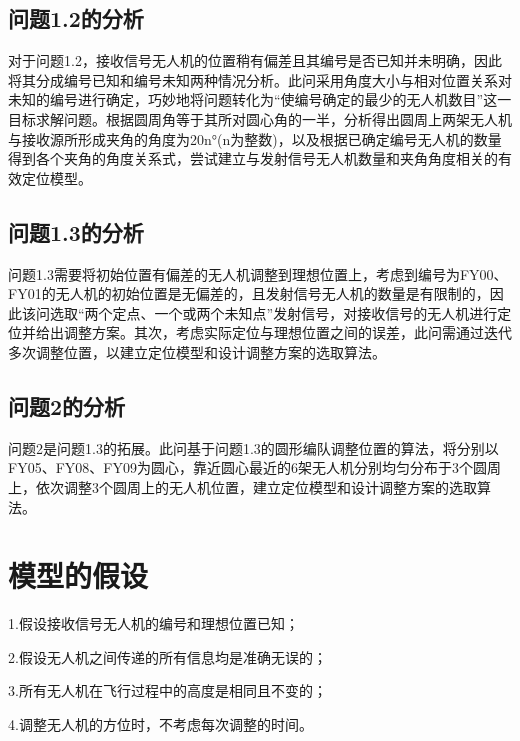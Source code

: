 \documentclass[12pt]{ctexart}
\begin{document}
\begin{spacing}{1.5}
\subsection{问题1.2的分析}
对于问题1.2，接收信号无人机的位置稍有偏差且其编号是否已知并未明确，因此将其分成编号已知和编号未知两种情况分析。此问采用角度大小与相对位置关系对未知的编号进行确定，巧妙地将问题转化为“使编号确定的最少的无人机数目”这一目标求解问题。根据圆周角等于其所对圆心角的一半，分析得出圆周上两架无人机与接收源所形成夹角的角度为20n°(n为整数)，以及根据已确定编号无人机的数量得到各个夹角的角度关系式，尝试建立与发射信号无人机数量和夹角角度相关的有效定位模型。
\subsection{问题1.3的分析}
问题1.3需要将初始位置有偏差的无人机调整到理想位置上，考虑到编号为FY00、FY01的无人机的初始位置是无偏差的，且发射信号无人机的数量是有限制的，因此该问选取“两个定点、一个或两个未知点”发射信号，对接收信号的无人机进行定位并给出调整方案。其次，考虑实际定位与理想位置之间的误差，此问需通过迭代多次调整位置，以建立定位模型和设计调整方案的选取算法。
\subsection{问题2的分析}
问题2是问题1.3的拓展。此问基于问题1.3的圆形编队调整位置的算法，将分别以FY05、FY08、FY09为圆心，靠近圆心最近的6架无人机分别均匀分布于3个圆周上，依次调整3个圆周上的无人机位置，建立定位模型和设计调整方案的选取算法。

\section{模型的假设}
1.假设接收信号无人机的编号和理想位置已知；

2.假设无人机之间传递的所有信息均是准确无误的；

3.所有无人机在飞行过程中的高度是相同且不变的；

4.调整无人机的方位时，不考虑每次调整的时间。


\end{spacing}
\end{document}
